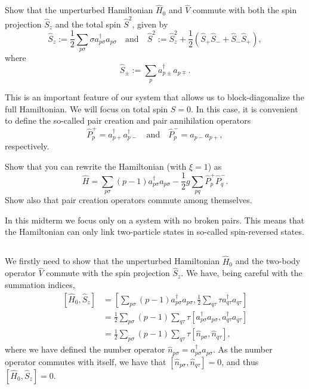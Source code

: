 Show that the unperturbed Hamiltonian $\hat{H}_0$ and $\hat{V}$ commute with both the spin projection $\hat{S}_z$ and the total spin $\hat{S}^2$, given by
\begin{equation*}
    \hat{S}_z := \frac{1}{2} \sum_{p\sigma} \sigma a^\dag_{p\sigma} a_{p\sigma} \quad \text{and} \quad \hat{S}^2 := \hat{S}_z^2 + \frac{1}{2}(\hat{S}_ + \hat{S}_ - + \hat{S}_ - \hat{S}_+),
\end{equation*}
where
\begin{equation*}
    \hat{S}_\pm := \sum_{p} a^\dag_{p\pm} a_{p\mp}.
\end{equation*}

This is an important feature of our system that allows us to block-diagonalize the full Hamiltonian.
We will focus on total spin $S=0$.
In this case, it is convenient to define the so-called pair creation and pair annihilation operators
\begin{equation*}
    \hat{P}^{+}_p = a^\dag_{p+} a^\dag_{p-} \quad \text{and} \quad \hat{P}^{-}_p = a_{p-} a_{p+},
\end{equation*}
respectively.

Show that you can rewrite the Hamiltonian (with $\xi=1$) as
\begin{equation*}
    \hat{H} = \sum_{p\sigma} (p-1) a_{p\sigma}^{\dagger} a_{p\sigma} - \frac{1}{2} g \sum_{pq} \hat{P}^{+}_p \hat{P}^{-}_q.
\end{equation*}
Show also that pair creation operators  commute among themselves.

In this midterm we focus only on a system with no broken pairs.
This means that the Hamiltonian can only link two-particle states in so-called spin-reversed states.

\subsection{}
We firstly need to show that the unperturbed Hamiltonian $\hat{H}_0$ and the two-body operator $\hat{V}$ commute with the spin projection $\hat{S}_z$.
We have, being careful with the summation indices,
\begin{align*}
    \left[ \hat{H}_0, \hat{S}_z \right]
    &= \left[
        \sum_{p\sigma} (p-1) a_{p\sigma}^{\dagger} a_{p\sigma},
        \frac{1}{2} \sum_{q\tau} \tau a^\dag_{q\tau} a_{q\tau}
    \right] \\
    &= \frac{1}{2} \sum_{p\sigma} (p-1) \sum_{q\tau} \tau \left[
        a_{p\sigma}^{\dagger} a_{p\sigma},
        a^\dag_{q\tau} a_{q\tau}
    \right] \\
    &= \frac{1}{2} \sum_{p\sigma} (p-1) \sum_{q\tau} \tau \left[
        \hat{n}_{p\sigma}, \hat{n}_{q\tau}
    \right],
\end{align*}
where we have defined the number operator $\hat{n}_{p\sigma} = a_{p\sigma}^{\dagger} a_{p\sigma}$.
As the number operator commutes with itself, we have that $\left[ \hat{n}_{p\sigma}, \hat{n}_{q\tau} \right] = 0$, and thus $[ \hat{H}_0, \hat{S}_z ] = 0$.

